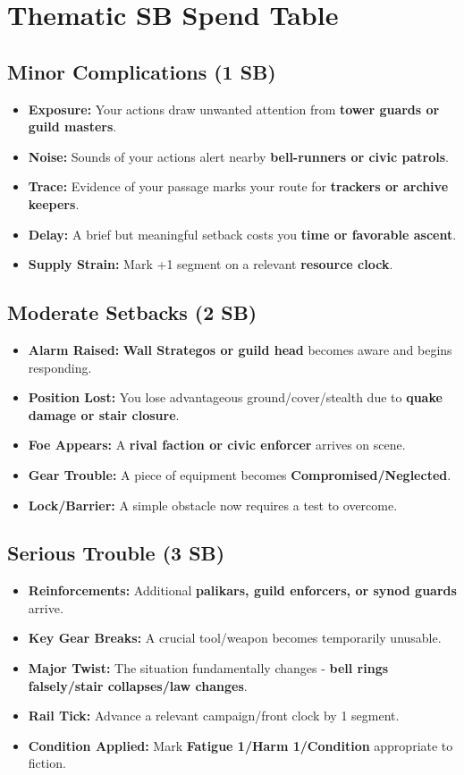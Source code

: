 \section*{Thematic SB Spend Table}
\label{sec:thepyrgos-sb}

\subsection*{Minor Complications (1 SB)}
\begin{itemize}
\item \textbf{Exposure:} Your actions draw unwanted attention from \textbf{tower guards or guild masters}.
\item \textbf{Noise:} Sounds of your actions alert nearby \textbf{bell-runners or civic patrols}.
\item \textbf{Trace:} Evidence of your passage marks your route for \textbf{trackers or archive keepers}.
\item \textbf{Delay:} A brief but meaningful setback costs you \textbf{time or favorable ascent}.
\item \textbf{Supply Strain:} Mark +1 segment on a relevant \textbf{resource clock}.
\end{itemize}

\subsection*{Moderate Setbacks (2 SB)}
\begin{itemize}
\item \textbf{Alarm Raised:} \textbf{Wall Strategos or guild head} becomes aware and begins responding.
\item \textbf{Position Lost:} You lose advantageous ground/cover/stealth due to \textbf{quake damage or stair closure}.
\item \textbf{Foe Appears:} A \textbf{rival faction or civic enforcer} arrives on scene.
\item \textbf{Gear Trouble:} A piece of equipment becomes \textbf{Compromised/Neglected}.
\item \textbf{Lock/Barrier:} A simple obstacle now requires a test to overcome.
\end{itemize}

\subsection*{Serious Trouble (3 SB)}
\begin{itemize}
\item \textbf{Reinforcements:} Additional \textbf{palikars, guild enforcers, or synod guards} arrive.
\item \textbf{Key Gear Breaks:} A crucial tool/weapon becomes temporarily unusable.
\item \textbf{Major Twist:} The situation fundamentally changes - \textbf{bell rings falsely/stair collapses/law changes}.
\item \textbf{Rail Tick:} Advance a relevant campaign/front clock by 1 segment.
\item \textbf{Condition Applied:} Mark \textbf{Fatigue 1/Harm 1/Condition} appropriate to fiction.
\end{itemize}

